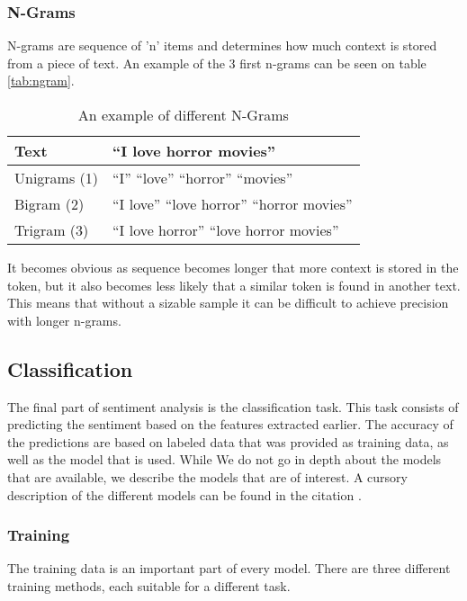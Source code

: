 \subsubsection{N-Grams}
N-grams are sequence of 'n' items and determines how much context is stored
from a piece of text. An example of the 3 first n-grams can be seen on table
\autoref{tab:ngram}. 

\begin{table}[H]
\centering
\begin{tabular}{|l|l|}
\hline
Text & ``I love horror movies'' \\ \hline
Unigrams (1) &
``I'' ``love'' ``horror'' ``movies''
\\ \hline 
Bigram (2) &
``I love'' ``love horror'' ``horror movies''
\\ \hline
Trigram (3) &
``I love horror'' ``love horror movies''
\\ \hline
\end{tabular}
\caption{An example of different N-Grams}
\label{tab:ngram}
\end{table}

It becomes obvious as sequence becomes longer that more context is stored in the
token, but it also becomes less likely that a similar token is found in another
text. This means that without a sizable sample it can be difficult to achieve
precision with longer n-grams.

\subsection{Classification}
The final part of sentiment analysis is the classification task. This task
consists of predicting the sentiment based on the features extracted earlier.
The accuracy of the predictions are based on labeled data that was provided as
training data, as well as the model that is used. While We do not go in depth
about the models that are available, we describe the models that are of
interest. A cursory description of the different models can be found in the
citation \citep{Classification}.

\subsubsection{Training}
The training data is an important part of every model. There are three different
training methods, each suitable for a different task.

